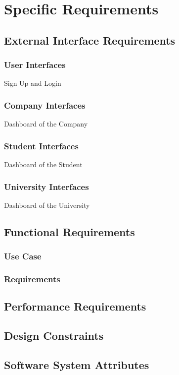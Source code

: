 \chapter{Specific Requirements}

\section{External Interface Requirements}

\subsection{User Interfaces}
Sign Up and Login

\subsection{Company Interfaces}
Dashboard of the Company

\subsection{Student Interfaces}
Dashboard of the Student

\subsection{University Interfaces}
Dashboard of the University

\section{Functional Requirements}

\subsection{Use Case}

\subsection{Requirements}

\section{Performance Requirements}

\section{Design Constraints}

\section{Software System Attributes}